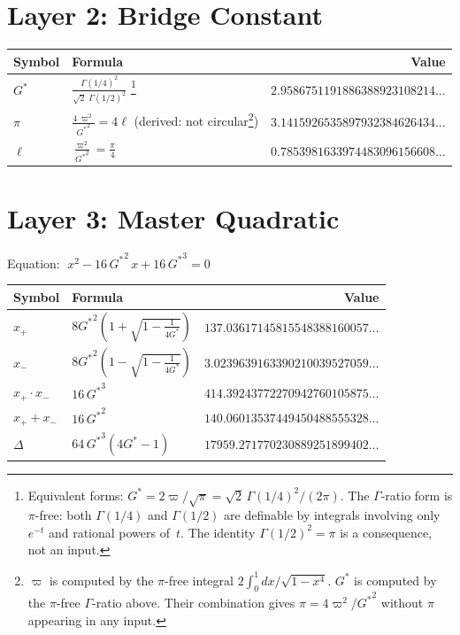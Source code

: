 \documentclass[11pt,a4paper]{article}
\newcommand{\Gstar}{{G^{*}}}
\newcommand{\vpi}{\varpi}
\begin{document}
\section*{Layer 2: Bridge Constant}

\begin{longtable}{lp{5.5cm}r}
\toprule
\textbf{Symbol} & \textbf{Formula} & \textbf{Value} \\
\midrule
\endhead
$\Gstar$ & $\displaystyle\frac{\Gamma(1/4)^2}{\sqrt{2}\;\Gamma(1/2)^2}$%
\footnote{Equivalent forms: $\Gstar = 2\vpi/\sqrt{\pi} = \sqrt{2}\,\Gamma(1/4)^2/(2\pi)$. The $\Gamma$-ratio form is $\pi$-free: both $\Gamma(1/4)$ and $\Gamma(1/2)$ are definable by integrals involving only $e^{-t}$ and rational powers of~$t$. The identity $\Gamma(1/2)^2 = \pi$ is a consequence, not an input.} &
$2.9586751191886388923108214\ldots$ \\[8pt]
$\pi$ & $\displaystyle\frac{4\,\vpi^2}{\Gstar^2} = 4\ell$ \quad (derived: not circular\footnote{$\vpi$ is computed by the $\pi$-free integral $2\!\int_0^1 dx/\sqrt{1-x^4}$. $\Gstar$ is computed by the $\pi$-free $\Gamma$-ratio above. Their combination gives $\pi = 4\vpi^2/\Gstar^2$ without $\pi$ appearing in any input.}) &
$3.1415926535897932384626434\ldots$ \\[8pt]
$\ell$ & $\displaystyle\frac{\vpi^2}{\Gstar^2} = \frac{\pi}{4}$ &
$0.7853981633974483096156608\ldots$ \\
\bottomrule
\end{longtable}

\section*{Layer 3: Master Quadratic}

\noindent Equation: $\;x^2 - 16\,\Gstar^2\, x + 16\,\Gstar^3 = 0$

\begin{longtable}{lp{5.5cm}r}
\toprule
\textbf{Symbol} & \textbf{Formula} & \textbf{Value} \\
\midrule
\endhead
$x_+$ & $8\Gstar^2\!\left(1 + \sqrt{1 - \frac{1}{4\Gstar}}\right)$ &
$137.03617145815548388160057\ldots$ \\[8pt]
$x_-$ & $8\Gstar^2\!\left(1 - \sqrt{1 - \frac{1}{4\Gstar}}\right)$ &
$3.0239639163390210039527059\ldots$ \\[8pt]
$x_+\! \cdot\! x_-$ & $16\,\Gstar^3$ &
$414.39243772270942760105875\ldots$ \\[4pt]
$x_+\!+\!x_-$ & $16\,\Gstar^2$ &
$140.06013537449450488555328\ldots$ \\[4pt]
$\Delta$ & $64\,\Gstar^3(4\Gstar - 1)$ &
$17959.271770230889251899402\ldots$ \\
\bottomrule
\end{longtable}
\end{document}
